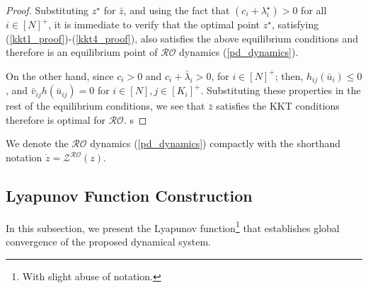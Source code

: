 \documentclass[journal,twoside,web]{ieeecolor}
\newcommand{\rev}[1]{\textcolor{revisionblue}{#1}}
\begin{document}
\begin{proof}
Substituting $z^\star$ for $\bar{z}$, and using the fact that $(c_i+\lambda_i^\star)>0$ for all $i\in[N]^+$, it is immediate to verify that the optimal point $z^\star$, satisfying (\ref{kkt1_proof})-(\ref{kkt4_proof}), also satisfies the above equilibrium conditions and therefore is an equilibrium point of $\mathcal{RO}$ dynamics (\ref{pd_dynamics}).

On the other hand, since $c_i> 0$ and $c_i+\bar{\lambda}_i>0$,  for $i\in[N]^+$; then, $h_{ij}(\bar{u}_i)\leq 0$, and $\bar{v}_{ij} h(\bar{u}_{ij})=0$ for $i\in[N],j\in[K_i]^+$. Substituting these properties in the rest of the equilibrium conditions, we see that $\bar{z}$ satisfies the KKT conditions therefore is optimal for $\mathcal{RO}$.
s
\end{proof}


We denote the $\mathcal{RO}$ dynamics (\ref{pd_dynamics}) compactly with the shorthand notation $\dot z=\mathcal{Z}^{\mathcal{RO}}(z)$.

\subsection*{\rev{Lyapunov Function Construction}}
In this subsection, we present the Lyapunov function\footnote{With slight abuse of notation.} that establishes global convergence of the proposed dynamical system.
\end{document}

